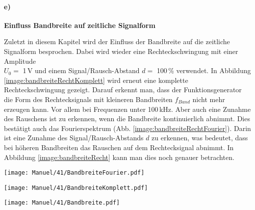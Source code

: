 \paragraph{e)}\textbf{Einfluss Bandbreite auf zeitliche Signalform}

Zuletzt in diesem Kapitel wird der Einfluss der Bandbreite auf die zeitliche Signalform besprochen. Dabei wird wieder eine Rechteckschwingung mit einer Amplitude\\ $U_0=$ 1\,V und einem Signal/Rausch-Abstand $d=$ 100\,\% verwendet. In Abbildung \ref{image:bandbreiteRechtKomplett} wird erneut eine komplette Rechteckschwingung gezeigt. Darauf erkennt man, dass der Funktionsgenerator die Form des Rechtecksignals mit kleineren Bandbreiten $f_{Band}$ nicht mehr erzeugen kann. Vor allem bei Frequenzen unter 100\,kHz. Aber auch eine Zunahme des Rauschens ist zu erkennen, wenn die Bandbreite kontinuierlich abnimmt. Dies bestätigt auch das Fourierspektrum (Abb. \ref{image:bandbreiteRechtFourier}). Darin ist eine Zunahme des Signal/Rausch-Abstands $d$ zu erkennen, was bedeutet, dass bei höheren Bandbreiten das Rauschen auf dem Rechtecksignal abnimmt. In Abbildung \ref{image:bandbreiteRecht} kann man dies noch genauer betrachten.
\begin{center}
    \texttt{[image: Manuel/41/BandbreiteFourier.pdf]}
    \label{image:bandbreiteRechtFourier}
\end{center} 
\newpage
\begin{center}
    \texttt{[image: Manuel/41/BandbreiteKomplett.pdf]}
    \label{image:bandbreiteRechtKomplett}
\end{center}
\begin{center}
    \texttt{[image: Manuel/41/Bandbreite.pdf]}
    \label{image:bandbreiteRecht}
\end{center} 

